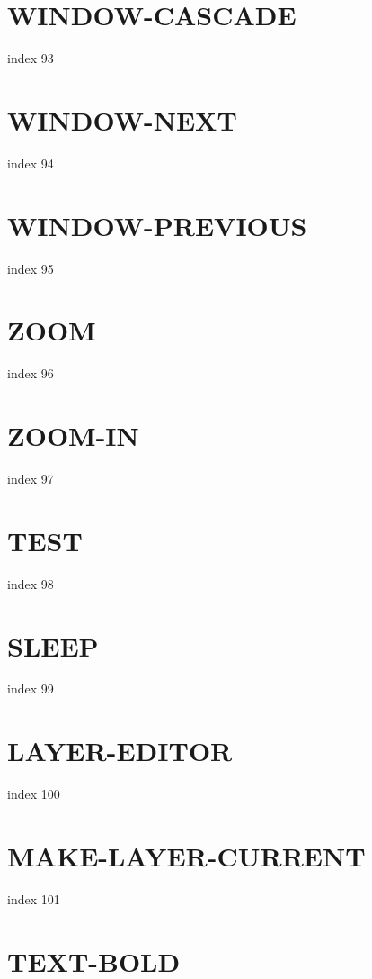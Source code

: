 \documentclass[10pt]{report}
\begin{document}
\section{WINDOW-CASCADE}

index 93

\section{WINDOW-NEXT}

index 94

\section{WINDOW-PREVIOUS}

index 95

\section{ZOOM}

 index 96

\section{ZOOM-IN}

index 97

\section{TEST}

 index 98

\section{SLEEP}

index 99

\section{LAYER-EDITOR}

index 100

\section{MAKE-LAYER-CURRENT}

index 101

\section{TEXT-BOLD}
\end{document}
